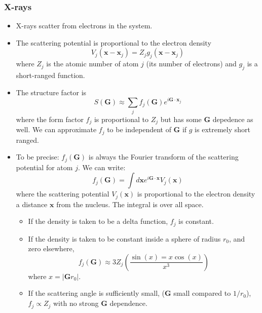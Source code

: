 \documentclass[10pt]{article}
\begin{document}
\subsubsection{X-rays}
\begin{itemize}
  \item X-rays scatter from electrons in the system.
  \item The scattering potential is proportional to the electron density
  $$V_{j}(\textbf{x} - \textbf{x}_{j}) = Z_{j}g_{j}(\textbf{x} - \textbf{x}_{j})$$
  where $Z_{j}$ is the atomic number of atom $j$ (its number of electrons) and $g_{j}$ is a short-ranged function.
  \item The structure factor is
  $$S(\textbf{G}) \approx \sum_{j} f_{j}(\textbf{G})e^{i\textbf{G}\cdot\textbf{x}_{j}}$$
  where the form factor $f_{j}$ is proportional to $Z_{j}$ but has some $\textbf{G}$ depedence as well. We can approximate
  $f_{j}$ to be independent of $\textbf{G}$ if $g$ is extremely short ranged.
  \item To be precise: $f_{j}(\textbf{G})$ is always the Fourier transform of the scattering potential for atom $j$.
  We can write:
    $$f_{j}(\textbf{G}) = \int d\textbf{x}e^{i\textbf{G}\cdot\textbf{x}}V_{j}(\textbf{x})$$
    where the scattering potential $V_{j}(\textbf{x})$ is proportional to the electron density a distance $\textbf{x}$ from the nucleus.
    The integral is over all space.
    \begin{itemize}
      \item If the density is taken to be a delta function, $f_{j}$ is constant.
      \item If the density is taken to be constant inside a sphere of radius $r_0$, and zero elsewhere,
      $$f_{j}(\textbf{G}) \approx 3Z_{j} \left ( \frac{\sin(x) = x\cos(x)}{x^{3}}\right )$$
      where $x = |\textbf{G}r_{0}|$.
      \item If the scattering angle is sufficiently small, ($\textbf{G}$ small compared to $1/r_0$), $f_{j} \propto Z_{j}$ with
      no strong $\textbf{G}$ dependence.
    \end{itemize}
\end{itemize}
\end{document}

